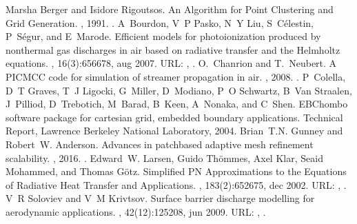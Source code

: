 \documentclass[letterpaper,10pt,english]{sphinxmanual}
\begin{document}
\begin{sphinxthebibliography}{1}
Marsha Berger and Isidore Rigoutsos. An Algorithm for Point Clustering and Grid Generation. , 1991. .
A Bourdon, V P Pasko, N Y Liu, S Célestin, P Ségur, and E Marode. Efficient models for photoionization produced by non\sphinxhyphen{}thermal gas discharges in air based on radiative transfer and the Helmholtz equations. , 16(3):656\textendash{}678, aug 2007. URL: , .
O. Chanrion and T. Neubert. A PIC\sphinxhyphen{}MCC code for simulation of streamer propagation in air. , 2008. .
P Colella, D T Graves, T J Ligocki, G Miller, D Modiano, P O Schwartz, B Van Straalen, J Pilliod, D Trebotich, M Barad, B Keen, A Nonaka, and C Shen. EBChombo software package for cartesian grid, embedded boundary applications. Technical Report, Lawrence Berkeley National Laboratory, 2004.
Brian T.N. Gunney and Robert W. Anderson. Advances in patch\sphinxhyphen{}based adaptive mesh refinement scalability. , 2016. .
Edward W. Larsen, Guido Thömmes, Axel Klar, Seaid Mohammed, and Thomas Götz. Simplified PN Approximations to the Equations of Radiative Heat Transfer and Applications. , 183(2):652\textendash{}675, dec 2002. URL: , .
V R Soloviev and V M Krivtsov. Surface barrier discharge modelling for aerodynamic applications. , 42(12):125208, jun 2009. URL: , .

\end{sphinxthebibliography}
\end{document}
